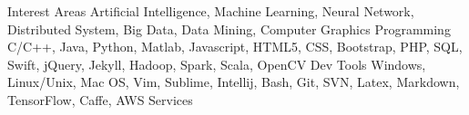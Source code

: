 \begin{cvskills}
    \cvskill
    {Interest Areas}
    {Artificial Intelligence, Machine Learning, Neural Network, Distributed System, Big Data, Data Mining, Computer Graphics}
    \cvskill
    {Programming}
    {C/C++, Java, Python, Matlab, Javascript, HTML5, CSS, Bootstrap, PHP, SQL, Swift, jQuery, Jekyll, Hadoop, Spark, Scala, OpenCV}
    \cvskill
    {Dev Tools}
    {Windows, Linux/Unix, Mac OS, Vim, Sublime, Intellij, Bash, Git, SVN, Latex, Markdown, TensorFlow, Caffe, AWS Services}
\end{cvskills}
